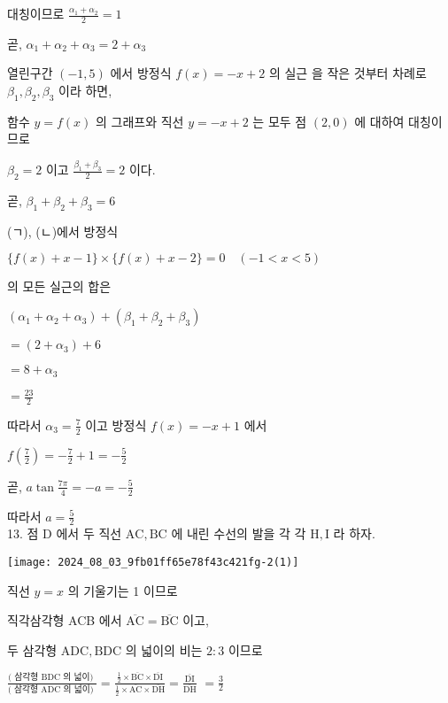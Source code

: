 \documentclass[10pt]{article}
\begin{document}
대칭이므로 \(\frac{\alpha_{1}+\alpha_{2}}{2}=1\)

곧, \(\alpha_{1}+\alpha_{2}+\alpha_{3}=2+\alpha_{3}\)

열린구간 \((-1,5)\) 에서 방정식 \(f(x)=-x+2\) 의 실근 을 작은 것부터 차례로 \(\beta_{1}, \beta_{2}, \beta_{3}\) 이라 하면,

함수 \(y=f(x)\) 의 그래프와 직선 \(y=-x+2\) 는 모두 점 \((2,0)\) 에 대하여 대칭이므로

\(\beta_{2}=2\) 이고 \(\frac{\beta_{1}+\beta_{3}}{2}=2\) 이다.

곧, \(\beta_{1}+\beta_{2}+\beta_{3}=6\)

(ㄱ), (ㄴ)에서 방정식

\(\{f(x)+x-1\} \times\{f(x)+x-2\}=0 \quad(-1<x<5)\)

의 모든 실근의 합은

\(\left(\alpha_{1}+\alpha_{2}+\alpha_{3}\right)+\left(\beta_{1}+\beta_{2}+\beta_{3}\right)\)

\(=\left(2+\alpha_{3}\right)+6\)

\(=8+\alpha_{3}\)

\(=\frac{23}{2}\)

따라서 \(\alpha_{3}=\frac{7}{2}\) 이고 방정식 \(f(x)=-x+1\) 에서

\(f\left(\frac{7}{2}\right)=-\frac{7}{2}+1=-\frac{5}{2}\)

곧, \(a \tan \frac{7 \pi}{4}=-a=-\frac{5}{2}\)

따라서 \(a=\frac{5}{2}\)\\
13. 점 D 에서 두 직선 \(\mathrm{AC}, \mathrm{BC}\) 에 내린 수선의 발을 각 각 \(\mathrm{H}, \mathrm{I}\) 라 하자.

\begin{center}
\texttt{[image: 2024\_08\_03\_9fb01ff65e78f43c421fg-2(1)]}
\end{center}

직선 \(y=x\) 의 기울기는 1 이므로

직각삼각형 ACB 에서 \(\overline{\mathrm{AC}}=\overline{\mathrm{BC}}\) 이고,

두 삼각형 \(\mathrm{ADC}, \mathrm{BDC}\) 의 넓이의 비는 \(2: 3\) 이므로

\(\frac{(\text { 삼각형 } \mathrm{BDC} \text { 의 넓이) }}{(\text { 삼각형 } \mathrm{ADC} \text { 의 넓이) }}=\frac{\frac{1}{2} \times \overline{\mathrm{BC}} \times \overline{\mathrm{DI}}}{\frac{1}{2} \times \overline{\mathrm{AC}} \times \overline{\mathrm{DH}}}=\frac{\overline{\mathrm{DI}}}{\overline{\mathrm{DH}}}\) \(=\frac{3}{2}\)
\end{document}
